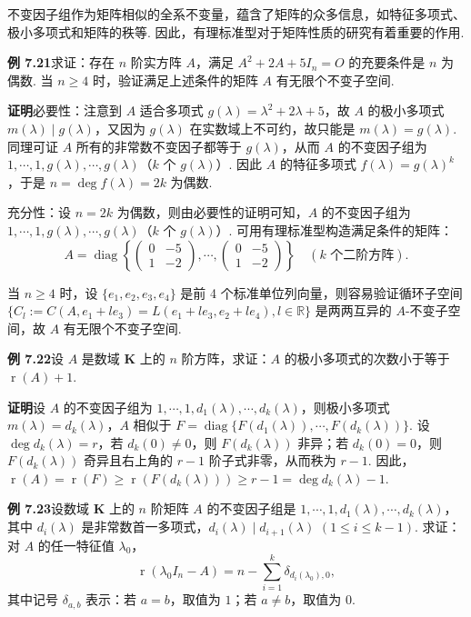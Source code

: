 \documentclass[UTF8,12pt,a4paper,fontset=fandol]{ctexart}
\begin{document}
不变因子组作为矩阵相似的全系不变量，蕴含了矩阵的众多信息，如特征多项式、极小多项式和矩阵的秩等. 因此，有理标准型对于矩阵性质的研究有着重要的作用.

\noindent\textbf{例 7.21}\quad 求证：存在 $n$ 阶实方阵 $A$，满足 $A^2+2A+5I_n=O$ 的充要条件是 $n$ 为偶数. 当 $n\ge 4$ 时，验证满足上述条件的矩阵 $A$ 有无限个不变子空间.

\noindent\textbf{证明}\quad 必要性：注意到 $A$ 适合多项式 $g(\lambda)=\lambda^2+2\lambda+5$，故 $A$ 的极小多项式 $m(\lambda)\mid g(\lambda)$，又因为 $g(\lambda)$ 在实数域上不可约，故只能是 $m(\lambda)=g(\lambda)$. 同理可证 $A$ 所有的非常数不变因子都等于 $g(\lambda)$，从而 $A$ 的不变因子组为 $1,\cdots,1,g(\lambda),\cdots,g(\lambda)$（$k$ 个 $g(\lambda)$）. 因此 $A$ 的特征多项式 $f(\lambda)=g(\lambda)^k$，于是 $n=\deg f(\lambda)=2k$ 为偶数.

充分性：设 $n=2k$ 为偶数，则由必要性的证明可知，$A$ 的不变因子组为 $1,\cdots,1,g(\lambda),\cdots,g(\lambda)$（$k$ 个 $g(\lambda)$）. 可用有理标准型构造满足条件的矩阵：
\[
A=\operatorname{diag}\left\{
\left(\begin{array}{cc}
0 & -5\\
1 & -2
\end{array}\right),
\cdots,
\left(\begin{array}{cc}
0 & -5\\
1 & -2
\end{array}\right)
\right\}
\quad(k\text{ 个二阶方阵}).
\]

当 $n\ge 4$ 时，设 $\{e_1,e_2,e_3,e_4\}$ 是前 4 个标准单位列向量，则容易验证循环子空间 $\{C_l:=C(A,e_1+le_3)=L(e_1+le_3,e_2+le_4),l\in\mathbb{R}\}$ 是两两互异的 $A$-不变子空间，故 $A$ 有无限个不变子空间.

\noindent\textbf{例 7.22}\quad 设 $A$ 是数域 $\mathbf{K}$ 上的 $n$ 阶方阵，求证：$A$ 的极小多项式的次数小于等于 $\operatorname{r}(A)+1$.

\noindent\textbf{证明}\quad 设 $A$ 的不变因子组为 $1,\cdots,1,d_1(\lambda),\cdots,d_k(\lambda)$，则极小多项式 $m(\lambda)=d_k(\lambda)$，$A$ 相似于 $F=\operatorname{diag}\{F(d_1(\lambda)),\cdots,F(d_k(\lambda))\}$. 设 $\deg d_k(\lambda)=r$，若 $d_k(0)\ne 0$，则 $F(d_k(\lambda))$ 非异；若 $d_k(0)=0$，则 $F(d_k(\lambda))$ 奇异且右上角的 $r-1$ 阶子式非零，从而秩为 $r-1$. 因此，$\operatorname{r}(A)=\operatorname{r}(F)\ge \operatorname{r}(F(d_k(\lambda)))\ge r-1=\deg d_k(\lambda)-1$.

\noindent\textbf{例 7.23}\quad 设数域 $\mathbf{K}$ 上的 $n$ 阶矩阵 $A$ 的不变因子组是 $1,\cdots,1,d_1(\lambda),\cdots,d_k(\lambda)$，其中 $d_i(\lambda)$ 是非常数首一多项式，$d_i(\lambda)\mid d_{i+1}(\lambda)$ $(1\le i\le k-1)$. 求证：对 $A$ 的任一特征值 $\lambda_0$，
\[
\operatorname{r}(\lambda_0I_n-A)=n-\sum_{i=1}^k\delta_{d_i(\lambda_0),0},
\]
其中记号 $\delta_{a,b}$ 表示：若 $a=b$，取值为 $1$；若 $a\ne b$，取值为 $0$.
\end{document}

